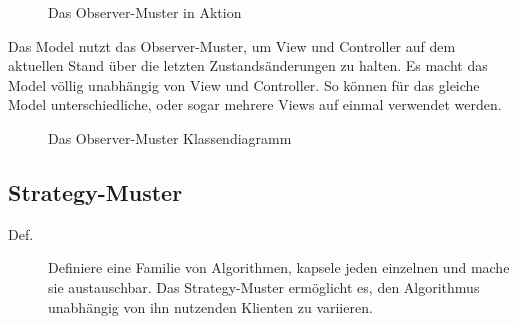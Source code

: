 \documentclass[11pt,a4paper,titlepage]{scrreprt}
\begin{document}
\enlargethispage{1cm}
\begin{figure}[h]
\caption{Das Observer-Muster in Aktion}
\end{figure}

Das Model nutzt das Observer-Muster, um View und Controller auf dem aktuellen
Stand über die letzten Zustandsänderungen zu halten.
Es macht das Model völlig unabhängig von View und Controller. So können für das gleiche
Model unterschiedliche, oder sogar mehrere Views auf einmal verwendet werden.

\begin{figure}[h]
\caption{Das Observer-Muster Klassendiagramm}
\end{figure}


\subsection{Strategy-Muster}
\begin{description}
\item[Def.]
Definiere eine Familie von Algorithmen, kapsele jeden einzelnen und mache sie austauschbar.
Das Strategy-Muster ermöglicht es, den Algorithmus unabhängig von ihn nutzenden Klienten
zu variieren.
\end{description}
\end{document}
